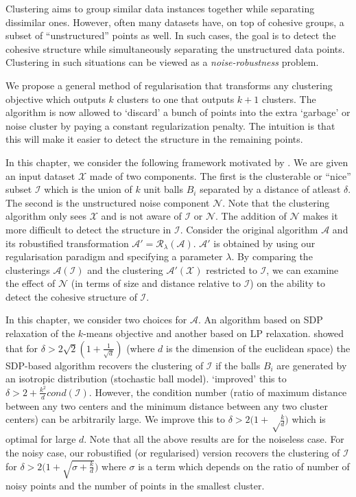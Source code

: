 \documentclass[12pt]{article}
\newcommand{\mc}{\mathcal}
\begin{document}
\fi

Clustering aims to group similar data instances together while separating dissimilar ones. However, often many datasets have, on top of cohesive groups, a subset of ``unstructured'' points as well. In such cases, the goal is to detect the cohesive structure while simultaneously separating the unstructured data points. Clustering in such situations can be viewed as a {\em noise-robustness} problem. 

We propose a general method of regularisation that transforms any clustering objective which outputs $k$ clusters to one that outputs $k+1$ clusters. The algorithm is now allowed to `discard' a bunch of points into the extra `garbage' or noise cluster by paying a constant regularization penalty. The intuition is that this will make it easier to detect the structure in the remaining points. %

In this chapter, we consider the following framework motivated by \cite{ben2014clustering}. We are given an input dataset $\mc X$ made of two components. The first is the clusterable or ``nice'' subset $\mc I$ which is the union of $k$ unit balls $B_i$ separated by a distance of atleast $\delta$. The second is the unstructured noise component $\mc N$. Note that the clustering algorithm only sees $\mc X$ and is not aware of $\mc I$ or $\mc N$. The addition of $\mc N$ makes it more difficult to detect the structure in $\mc I$. Consider the original algorithm $\mc A$ and its robustified transformation $\mc A' = \mc R_{\lambda}(\mc A)$. $\mc A'$ is obtained by using our regularisation paradigm and specifying a parameter $\lambda$. By comparing the clusterings $\mc A(\mc I)$ and the clustering $\mc A'(\mc X)$ restricted to $\mc I$, we can examine the effect of $\mc N$ (in terms of size and distance relative to $\mc I$) on the ability to detect the cohesive structure of $\mc I$.

In this chapter, we consider two choices for $\mc A$. An algorithm based on SDP relaxation of the $k$-means objective and another based on LP relaxation. \cite{awasthi2015relax} showed that for $\delta > 2\sqrt{2}(1+\frac{1}{\sqrt d})$ (where $d$ is the dimension of the euclidean space) the SDP-based algorithm recovers the clustering of $\mc I$ if the balls $B_i$ are generated by an isotropic distribution (stochastic ball model). \cite{iguchi2015tightness} `improved' this to $\delta > 2 + \frac{k^2}{d}cond(\mc I)$. However, the condition number (ratio of maximum distance between any two centers and the minimum distance between any two cluster centers) can be arbitrarily large. We improve this to $\delta > 2\big(1+\sqrt\frac{k}{d}\big)$ which is optimal for large $d$. Note that all the above results are for the noiseless case. For the noisy case, our robustified (or regularised) version recovers the clustering of $\mc I$ for $\delta > 2\big(1+\sqrt{\sigma + \frac{k}{d}}\big)$ where $\sigma$ is a term which depends on the ratio of number of noisy points and the number of points in the smallest cluster. 
\end{document}
